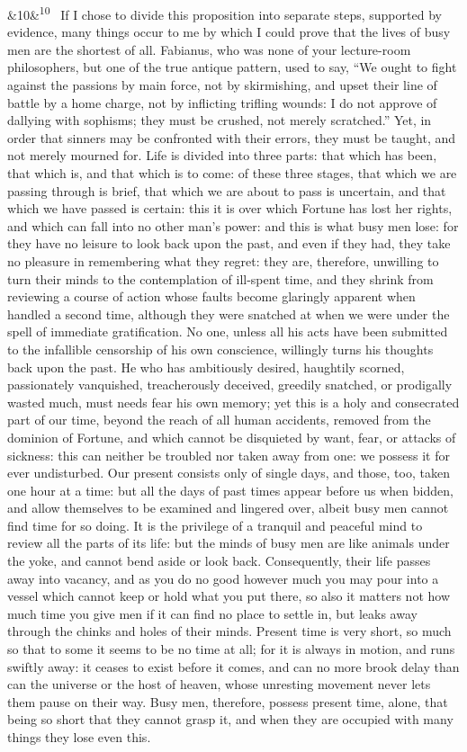 \documentclass[12pt]{article}
\newcommand{\para}[1][]{\par\noindent\ifx&#1&\else\textsuperscript{\footnotesize #1}~\fi}
\begin{document}
\para[10] If I chose to divide this proposition into separate steps, supported by evidence, many things occur to me by which I could prove that the lives of busy men are the shortest of all. Fabianus, who was none of your lecture-room philosophers, but one of the true antique pattern, used to say, “We ought to fight against the passions by main force, not by skirmishing, and upset their line of battle by a home charge, not by inflicting trifling wounds: I do not approve of dallying with sophisms; they must be crushed, not merely scratched.” Yet, in order that sinners may be confronted with their errors, they must be taught, and not merely mourned for. Life is divided into three parts: that which has been, that which is, and that which is to come: of these three stages, that which we are passing through is brief, that which we are about to pass is uncertain, and that which we have passed is certain: this it is over which Fortune has lost her rights, and which can fall into no other man’s power: and this is what busy men lose: for they have no leisure to look back upon the past, and even if they had, they take no pleasure in remembering what they regret: they are, therefore, unwilling to turn their minds to the contemplation of ill-spent time, and they shrink from reviewing a course of action whose faults become glaringly apparent when handled a second time, although they were snatched at when we were under the spell of immediate gratification. No one, unless all his acts have been submitted to the infallible censorship of his own conscience, willingly turns his thoughts back upon the past. He who has ambitiously desired, haughtily scorned, passionately vanquished, treacherously deceived, greedily snatched, or prodigally wasted much, must needs fear his own memory; yet this is a holy and consecrated part of our time, beyond the reach of all human accidents, removed from the dominion of Fortune, and which cannot be disquieted by want, fear, or attacks of sickness: this can neither be troubled nor taken away from one: we possess it for ever undisturbed. Our present consists only of single days, and those, too, taken one hour at a time: but all the days of past times appear before us when bidden, and allow themselves to be examined and lingered over, albeit busy men cannot find time for so doing. It is the privilege of a tranquil and peaceful mind to review all the parts of its life: but the minds of busy men are like animals under the yoke, and cannot bend aside or look back. Consequently, their life passes away into vacancy, and as you do no good however much you may pour into a vessel which cannot keep or hold what you put there, so also it matters not how much time you give men if it can find no place to settle in, but leaks away through the chinks and holes of their minds. Present time is very short, so much so that to some it seems to be no time at all; for it is always in motion, and runs swiftly away: it ceases to exist before it comes, and can no more brook delay than can the universe or the host of heaven, whose unresting movement never lets them pause on their way. Busy men, therefore, possess present time, alone, that being so short that they cannot grasp it, and when they are occupied with many things they lose even this.
\end{document}
